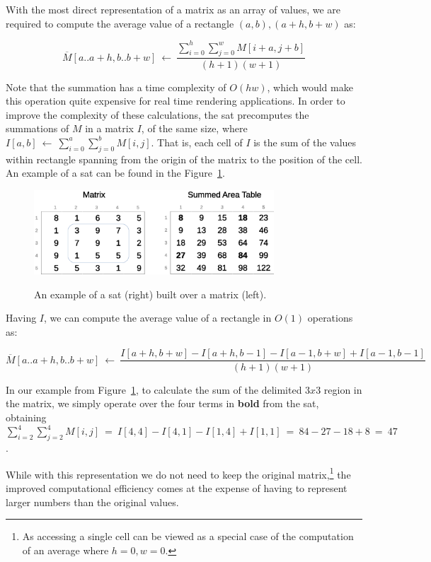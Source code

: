 \documentclass[a4paper,10pt,twoside]{book}
\begin{document}
    With the most direct representation of a matrix as an array of values, we are required to compute the average value of a rectangle $(a,b),(a+h,b+w)$ as:
    
    \[
    \overline{M}[a..a+h,b..b+w]~\leftarrow~
    \frac{\displaystyle\sum^h_{i=0}\displaystyle\sum^w_{j=0}M[i+a,j+b]}
    {(h+1)(w+1)}
    \]
    
    Note that the summation has a time complexity of $O(hw)$, which would make this operation quite expensive for real time rendering applications. In order to improve the complexity of these calculations, the \gls{sat} precomputes the summations of $M$ in a matrix $I$, of the same size, where $I[a,b]~\leftarrow~\displaystyle\sum^a_{i=0}\displaystyle\sum^b_{j=0}M[i,j]$. That is, each cell of $I$ is the sum of the values within rectangle spanning from the origin of the matrix to the position of the cell. An example of a \gls{sat} can be found in the Figure~\ref{fig:sat}.
    
    \begin{figure}[ht]
		\begin{center}
			{\includegraphics[width=0.8\textwidth]{figures/example_sat.eps}}
		\end{center}
		\caption{An example of a \acrlong{sat} (right) built over a matrix (left).}
		\label{fig:sat}
	\end{figure}
    
    Having $I$, we can compute the average value of a rectangle in $O(1)$ operations as:
    
    \[
    \overline{M}[a..a+h,b..b+w]~\leftarrow~
    \frac{I[a+h,b+w] - I[a+h,b-1] - I[a-1,b+w] + I[a-1,b-1]}
    {(h+1)(w+1)}
    \]
    
    In our example from Figure~\ref{fig:sat}, to calculate the sum of the delimited $3x3$ region in the matrix, we simply operate over the four terms in \textbf{bold} from the \gls{sat}, obtaining
    $\displaystyle\sum^4_{i=2}\displaystyle\sum^4_{j=2}M[i,j]~=~I[4,4]-I[4,1]-I[1,4]+I[1,1]~=~84-27-18+8~=~47$.
    
    While with this representation we do not need to keep the original matrix,\footnote{As accessing a single cell can be viewed as a special case of the computation of an average where $h=0,w=0$.} the improved computational efficiency comes at the expense of having to represent larger numbers than the original values.
	
\end{document}

